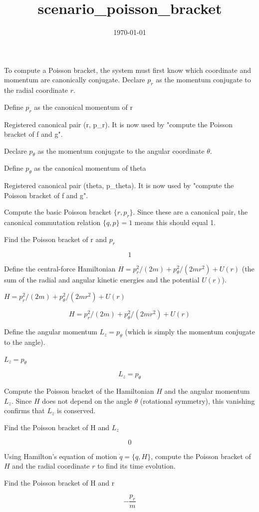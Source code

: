 \documentclass[dvipdfmx]{article}
\title{scenario\_poisson\_bracket}
\date{\today}
\begin{document}
\maketitle

To compute a Poisson bracket, the system must first know which coordinate and momentum are canonically conjugate. Declare $p_r$ as the momentum conjugate to the radial coordinate $r$.

Define $p_r$ as the canonical momentum of r

Registered canonical pair (r, p\_r). It is now used by "compute the Poisson bracket of f and g".

Declare $p_\theta$ as the momentum conjugate to the angular coordinate $\theta$.

Define $p_{\theta}$ as the canonical momentum of theta

Registered canonical pair (theta, p\_theta). It is now used by "compute the Poisson bracket of f and g".

Compute the basic Poisson bracket $\{r,p_r\}$. Since these are a canonical pair, the canonical commutation relation $\{q,p\}=1$ means this should equal 1.

Find the Poisson bracket of r and $p_r$

\begin{equation}
  1
  \label{eq:E1}
\end{equation}

Define the central-force Hamiltonian $H=p_r^2/(2m)+p_\theta^2/(2mr^2)+U(r)$ (the sum of the radial and angular kinetic energies and the potential $U(r)$).

$H = p_r^2/(2 m) + p_{\theta}^2/(2 m r^2) + U(r)$

\begin{equation}
  H = p_r^2/(2 m) + p_{\theta}^2/(2 m r^2) + U(r)
  \label{eq:E2}
\end{equation}

Define the angular momentum $L_z=p_\theta$ (which is simply the momentum conjugate to the angle).

$L_z = p_{\theta}$

\begin{equation}
  L_z = p_{\theta}
  \label{eq:E3}
\end{equation}

Compute the Poisson bracket of the Hamiltonian $H$ and the angular momentum $L_z$. Since $H$ does not depend on the angle $\theta$ (rotational symmetry), this vanishing confirms that $L_z$ is conserved.

Find the Poisson bracket of H and $L_z$

\begin{equation}
  0
  \label{eq:E4}
\end{equation}

Using Hamilton's equation of motion $\dot q=\{q,H\}$, compute the Poisson bracket of $H$ and the radial coordinate $r$ to find its time evolution.

Find the Poisson bracket of H and r

\begin{equation}
  -\frac{p_{r}}{m}
  \label{eq:E5}
\end{equation}
\end{document}
